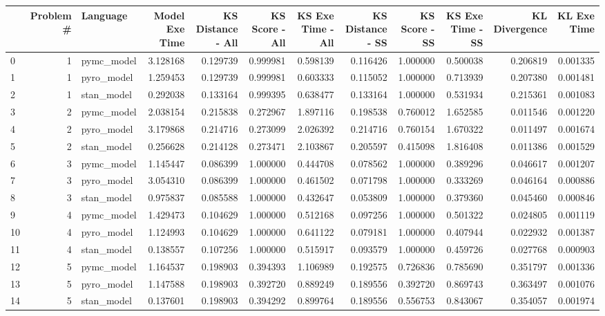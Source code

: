 \begin{tabular}{lrlrrrrrrrrr}
\toprule
 & Problem # & Language & Model Exe Time & KS Distance - All & KS Score - All & KS Exe Time - All & KS Distance - SS & KS Score - SS & KS Exe Time - SS & KL Divergence & KL Exe Time \\
\midrule
0 & 1 & pymc_model & 3.128168 & 0.129739 & 0.999981 & 0.598139 & 0.116426 & 1.000000 & 0.500038 & 0.206819 & 0.001335 \\
1 & 1 & pyro_model & 1.259453 & 0.129739 & 0.999981 & 0.603333 & 0.115052 & 1.000000 & 0.713939 & 0.207380 & 0.001481 \\
2 & 1 & stan_model & 0.292038 & 0.133164 & 0.999395 & 0.638477 & 0.133164 & 1.000000 & 0.531934 & 0.215361 & 0.001083 \\
3 & 2 & pymc_model & 2.038154 & 0.215838 & 0.272967 & 1.897116 & 0.198538 & 0.760012 & 1.652585 & 0.011546 & 0.001220 \\
4 & 2 & pyro_model & 3.179868 & 0.214716 & 0.273099 & 2.026392 & 0.214716 & 0.760154 & 1.670322 & 0.011497 & 0.001674 \\
5 & 2 & stan_model & 0.256628 & 0.214128 & 0.273471 & 2.103867 & 0.205597 & 0.415098 & 1.816408 & 0.011386 & 0.001529 \\
6 & 3 & pymc_model & 1.145447 & 0.086399 & 1.000000 & 0.444708 & 0.078562 & 1.000000 & 0.389296 & 0.046617 & 0.001207 \\
7 & 3 & pyro_model & 3.054310 & 0.086399 & 1.000000 & 0.461502 & 0.071798 & 1.000000 & 0.333269 & 0.046164 & 0.000886 \\
8 & 3 & stan_model & 0.975837 & 0.085588 & 1.000000 & 0.432647 & 0.053809 & 1.000000 & 0.379360 & 0.045460 & 0.000846 \\
9 & 4 & pymc_model & 1.429473 & 0.104629 & 1.000000 & 0.512168 & 0.097256 & 1.000000 & 0.501322 & 0.024805 & 0.001119 \\
10 & 4 & pyro_model & 1.124993 & 0.104629 & 1.000000 & 0.641122 & 0.079181 & 1.000000 & 0.407944 & 0.022932 & 0.001387 \\
11 & 4 & stan_model & 0.138557 & 0.107256 & 1.000000 & 0.515917 & 0.093579 & 1.000000 & 0.459726 & 0.027768 & 0.000903 \\
12 & 5 & pymc_model & 1.164537 & 0.198903 & 0.394393 & 1.106989 & 0.192575 & 0.726836 & 0.785690 & 0.351797 & 0.001336 \\
13 & 5 & pyro_model & 1.147588 & 0.198903 & 0.392720 & 0.889249 & 0.189556 & 0.392720 & 0.869743 & 0.363497 & 0.001076 \\
14 & 5 & stan_model & 0.137601 & 0.198903 & 0.394292 & 0.899764 & 0.189556 & 0.556753 & 0.843067 & 0.354057 & 0.001974 \\

\end{tabular}

